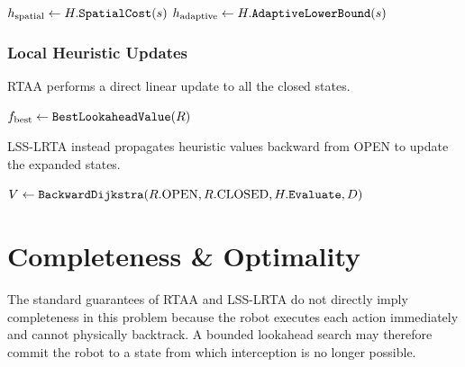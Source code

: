\documentclass[11pt]{article}
\begin{document}
\begin{algorithm}[H]
  \caption{Heuristic evaluation}
  \label{alg:evaluate-heuristic}
  \(h_{\mathrm{spatial}} \gets H.\FuncSty{SpatialCost}(s)\)\;
  \(h_{\mathrm{adaptive}} \gets H.\FuncSty{AdaptiveLowerBound}(s)\)\;
  \;
\end{algorithm}

\subsubsection{Local Heuristic Updates}

RTAA performs a direct linear update to all the closed states.

\begin{algorithm}[H]
  \caption{RTAA local heuristic update}
  \label{alg:rtaa-update}
  \(f_{\mathrm{best}} \gets \FuncSty{BestLookaheadValue}(R)\)\;
\end{algorithm}

LSS-LRTA instead propagates heuristic values backward from OPEN to update the expanded states.

\begin{algorithm}[H]
  \caption{LSS-LRTA local heuristic update}
  \label{alg:lss-lrta-update}
  \(V \gets
  \FuncSty{BackwardDijkstra}(R.\mathrm{OPEN},R.\mathrm{CLOSED},
  H.\FuncSty{Evaluate},D)\)\;
\end{algorithm}

\section{Completeness \& Optimality}
The standard guarantees of RTAA and LSS-LRTA do not directly imply completeness in this problem because the robot executes each action immediately and cannot physically backtrack. A bounded lookahead search may therefore commit the robot to a state from which interception is no longer possible.
\end{document}
